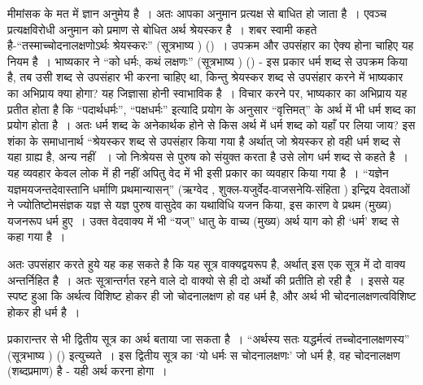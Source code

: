मीमांसक के मत में ज्ञान अनुमेय है~। अतः आपका अनुमान प्रत्यक्ष से बाधित हो जाता है~। एवञ्च प्रत्यक्षविरोधी अनुमान को प्रमाण से बोधित अर्थ श्रेयस्कर है~। शबर स्वामी कहते है-“तस्माच्चोदनालक्षणोऽर्थः श्रेयस्करः” (सूत्रभाष्य ) ()~। उपक्रम और उपसंहार का ऐक्य होना चाहिए यह नियम है~। भाष्यकार ने “को धर्मः, कथं लक्षणः” (सूत्रभाष्य ) () - इस प्रकार धर्म शब्द से उपक्रम किया है, तब उसी शब्द से उपसंहार भी करना चाहिए था, किन्तु श्रेयस्कर शब्द से उपसंहार करने में भाष्यकार का अभिप्राय क्या होगा? यह जिज्ञासा होनी स्वाभाविक है~। विचार करने पर, भाष्यकार का अभिप्राय यह प्रतीत होता है कि “पदार्थधर्मः”, “पक्षधर्मः” इत्यादि प्रयोग के अनुसार “वृत्तिमत्” के अर्थ में भी धर्म शब्द का प्रयोग होता है~। अतः धर्म शब्द के अनेकार्थक होने से किस अर्थ में धर्म शब्द को यहाँ पर लिया जाय? इस शंका के समाधानार्थ “श्रेयस्कर शब्द से उपसंहार किया गया है अर्थात् जो श्रेयस्कर हो वही धर्म शब्द से यहा ग्राह्य है, अन्य नहीं ~। जो निःश्रेयस से पुरुष को संयुक्त करता है उसे लोग धर्म शब्द से कहते है~। यह व्यवहार केवल लोक में ही नहीं अपितु वेद में भी इसी प्रकार का व्यवहार किया गया है~। “यज्ञेन यज्ञमयजन्तदेवास्तानि धर्माणि प्रथमान्यासन्” (ऋग्वेद , शुक्ल-यजुर्वेद-वाजसनेयि-संहिता ) इन्द्रिय देवताओं ने ज्योतिष्टोमसंज्ञक यज्ञ से यज्ञ पुरुष वासुदेव का यथाविधि यजन किया, इस कारण वे प्रथम (मुख्य) यजनरूप धर्म हुए~। उक्त वेदवाक्य में भी “यज्” धातु के वाच्य (मुख्य) अर्थ याग को ही ‘धर्म' शब्द से कहा गया है~।

अतः उपसंहार करते हुये यह कह सकते है कि यह सूत्र वाक्यद्वयरूप है, अर्थात् इस एक सूत्र में दो वाक्य अन्तर्निहित है~। अतः सूत्रान्तर्गत रहने वाले दो वाक्यो से ही दो अर्थो की प्रतीति हो रही है~। इससे यह स्पष्ट हुआ कि अर्थत्व विशिष्ट होकर ही जो चोदनालक्षण हो वह धर्म है, और अर्थ भी चोदनालक्षणत्वविशिष्ट होकर ही धर्म है~।

प्रकारान्तर से भी द्वितीय सूत्र का अर्थ बताया जा सकता है~। “अर्थस्य सतः यद्धर्मत्वं तच्चोदनालक्षणस्य” (सूत्रभाष्य ) () इत्युच्यते~। इस द्वितीय सूत्र का ‘यो धर्मः स चोदनालक्षणः' जो धर्म है, वह चोदनालक्षण (शब्दप्रमाण) है - यही अर्थ करना होगा~।\\[-.7cm]

